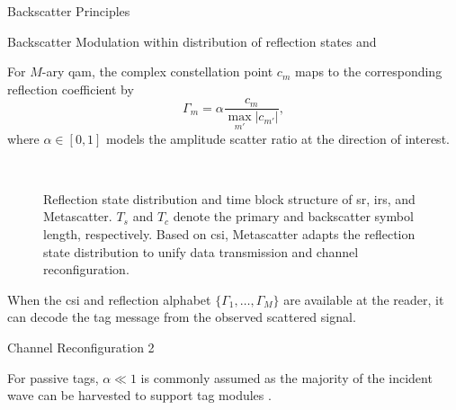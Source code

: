 \documentclass[journal]{IEEEtran}
\begin{document}
\begin{section}{Backscatter Principles}
\begin{subsection}{Backscatter Modulation}
		within distribution of reflection states and

		For $M$-ary \gls{qam}, the complex constellation point $c_m$ maps to the corresponding reflection coefficient by \cite{Thomas2012a}
		\begin{equation}
			\Gamma_m = \alpha \frac{c_m}{\max_{m'} \lvert c_{m'} \rvert},
			\label{eq:backscatter_modulation}
		\end{equation}
		where $\alpha \in [0,1]$ models the amplitude scatter ratio at the direction of interest.



		\begin{figure}[!t]
			\centering
			\\
			\caption{Reflection state distribution and time block structure of \gls{sr}, \gls{irs}, and Metascatter. $T_s$ and $T_c$ denote the primary and backscatter symbol length, respectively. Based on \gls{csi}, Metascatter adapts the reflection state distribution to unify data transmission and channel reconfiguration.}
		\end{figure}

		When the \gls{csi} and reflection alphabet $\{\Gamma_1,\ldots,\Gamma_M\}$ are available at the reader, it can decode the tag message from the observed scattered signal.

	\end{subsection}

	\begin{subsection}{Channel Reconfiguration}
		2
	\end{subsection}
	For passive tags, $\alpha \ll 1$ is commonly assumed as the majority of the incident wave can be harvested to support tag modules \cite{Thomas2012a}.


\end{section}
\end{document}
